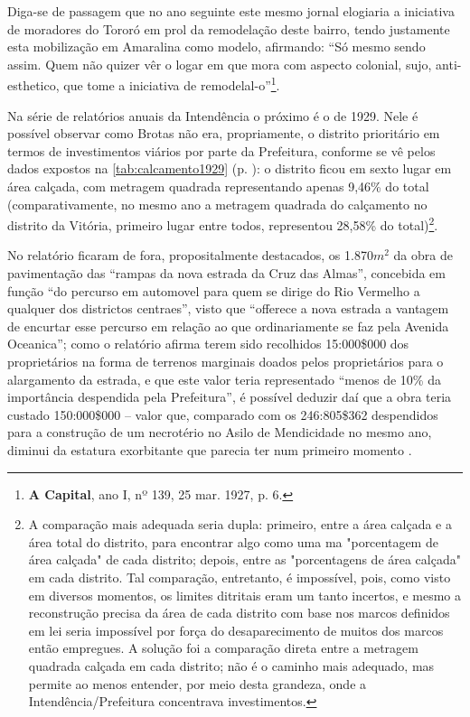Diga-se de passagem que no ano seguinte este mesmo jornal elogiaria a iniciativa de moradores do Tororó em prol da remodelação deste bairro, tendo justamente esta mobilização em Amaralina como modelo, afirmando: ``Só mesmo sendo assim. Quem não quizer vêr o logar em que mora com aspecto colonial, sujo, anti-esthetico, que tome a iniciativa de remodelal-o''\footnote{\textbf{A Capital}, ano I, nº 139, 25 mar. 1927, p. 6.}.

Na série de relatórios anuais da Intendência o próximo é o de 1929. Nele é possível observar como Brotas não era, propriamente, o distrito prioritário em termos de investimentos viários por parte da Prefeitura, conforme se vê pelos dados expostos na \autoref{tab:calcamento1929} (p. \pageref{tab:calcamento1929}): o distrito ficou em sexto lugar em área calçada, com metragem quadrada representando apenas 9,46\% do total (comparativamente, no mesmo ano a metragem quadrada do calçamento no distrito da Vitória, primeiro lugar entre todos, representou 28,58\% do total)\footnote{A comparação mais adequada seria dupla: primeiro, entre a área calçada e a área total do distrito, para encontrar algo como uma ma "porcentagem de área calçada" de cada distrito; depois, entre as "porcentagens de área calçada" em cada distrito. Tal comparação, entretanto, é impossível, pois, como visto em diversos momentos, os limites ditritais eram um tanto incertos, e mesmo a reconstrução precisa da área de cada distrito com base nos marcos definidos em lei seria impossível por força do desaparecimento de muitos dos marcos então empregues. A solução foi a comparação direta entre a metragem quadrada calçada em cada distrito; não é o caminho mais adequado, mas permite ao menos entender, por meio desta grandeza, onde a Intendência/Prefeitura concentrava investimentos.}.



No relatório ficaram de fora, propositalmente destacados, os 1.870$m^{2}$ da obra de pavimentação das “rampas da nova estrada da Cruz das Almas”, concebida em função “do percurso em automovel para quem se dirige do Rio Vermelho a qualquer dos districtos centraes”, visto que “offerece a nova estrada a vantagem de encurtar esse percurso em relação ao que ordinariamente se faz pela Avenida Oceanica”; como o relatório afirma terem sido recolhidos 15:000\$000 dos proprietários na forma de terrenos marginais doados pelos proprietários para o alargamento da estrada, e que este valor teria representado “menos de 10\% da importância despendida pela Prefeitura”, é possível deduzir daí que a obra teria custado 150:000\$000 – valor que, comparado com os 246:805\$362 despendidos para a construção de um necrotério no Asilo de Mendicidade no mesmo ano, diminui da estatura exorbitante que parecia ter num primeiro momento \cite[pp.~22-23]{salvador_relatorio_1929}.

